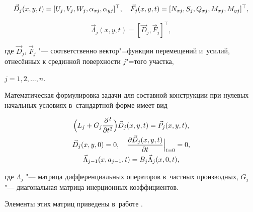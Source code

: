 $$

\vec{D}_j(x,y,t) = [U_j,V_j,W_j, \alpha_{xj}, \alpha_{yj}]^\top,\quad

\notag

\vec{F}_j(x,y,t) = [N_{xj},S_j,Q_{xj},M_{xj},M_{yj}]^\top, $$

\begin{equation}

\label{dyach:1}

\vec{\Lambda}_j(x,y,t) = [\vec{D}_j,\vec{F}_j]^\top ,

\end{equation}

где $\vec{D}_j$, $\vec{F}_j$ "--- соответственно вектор"=функции перемещений и~усилий, отнесённых к срединной поверхности $j$"=того участка, 

$j=1, 2, \ldots, n$.





Математическая формулировка задачи для составной конструкции при нулевых начальных условиях в~стандартной форме имеет вид

\begin{gather}

\label{dyach:2}

\Bigl(L_j+G_j\frac{\partial^2}{\partial t^2}\Bigr)\vec{D}_j(x, y, t)=\vec{P}_j(x,y,t),\\

\label{dyach:3}

\vec{D}_j(x, y, 0) = 0, \quad \frac{\partial \vec{D}_j(x,y,t)} { \partial t }\Big|_{t=0} = 0,\\

\label{dyach:4}

\vec{\Lambda }_{j-1}(x,a_{j-1},t) = B_j\vec{\Lambda }_j(x,0,t) ,

\end{gather}

где $\Lambda_j$ "--- матрица дифференциальных операторов в~частных производных, $G_j$ "--- диагональная матрица инерционных коэффициентов.

Элементы этих матриц приведены в~работе \cite{dyach:bib:Dyach}.





